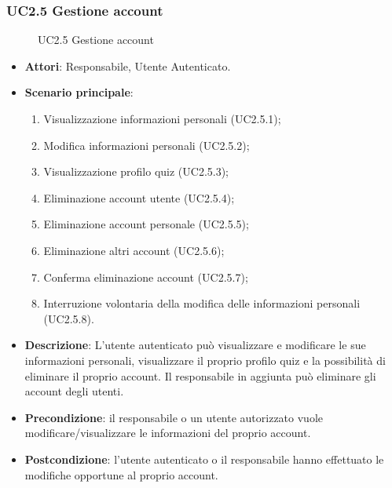 \subsubsection{UC2.5 Gestione account}
\begin{figure}[H]
\centering
\noindent{}
\caption{UC2.5 Gestione account}
\end{figure}
\begin{itemize}
\item \textbf{Attori}: Responsabile, Utente Autenticato.
\item \textbf{Scenario principale}:
\begin{enumerate}
\item Visualizzazione informazioni personali (UC2.5.1);
\item Modifica informazioni personali (UC2.5.2);
\item Visualizzazione profilo quiz (UC2.5.3);
\item Eliminazione account utente (UC2.5.4);
\item Eliminazione account personale (UC2.5.5);
\item Eliminazione altri account (UC2.5.6);
\item Conferma eliminazione account (UC2.5.7);
\item Interruzione volontaria della modifica delle informazioni personali (UC2.5.8).
\end{enumerate}
\item \textbf{Descrizione}: L'utente autenticato può visualizzare e modificare le sue informazioni personali, visualizzare il proprio profilo quiz e la possibilità di eliminare il proprio account. Il responsabile in aggiunta può eliminare gli account degli utenti.
\item \textbf{Precondizione}: il responsabile o un utente autorizzato vuole modificare/visualizzare le informazioni del proprio account.
\item \textbf{Postcondizione}: l'utente autenticato o il responsabile hanno effettuato le modifiche opportune al proprio account.
\end{itemize}
